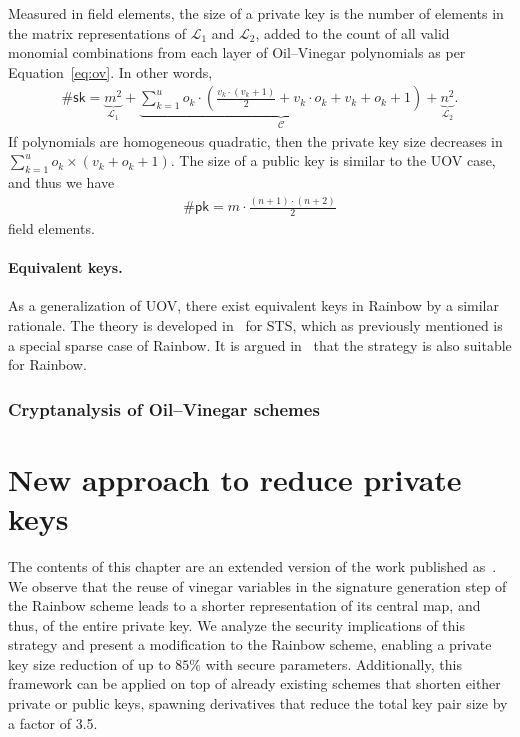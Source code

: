 \documentclass[draft, 12pt, a4paper, oneside]{memoir}
\theoremstyle{definition}
\begin{document}
Measured in field elements, the size of a private key is the number of elements in the matrix representations of $\mathcal{L}_{1}$ and $\mathcal{L}_{2}$, added to the count of all valid monomial combinations from each layer of Oil--Vinegar polynomials as per Equation~\ref{eq:ov}. In other words,
\begin{align}
  \#\mathsf{sk} = \underbrace{m^{2}}_{\mathcal{L}_{1}} 
    + \underbrace{\sum_{k = 1}^{u} o_{k} \cdot \left( \frac{v_{k} \cdot (v_{k} + 1)}{2} + v_{k} \cdot o_{k} + v_{k} + o_{k} + 1 \right)}_{\mathcal{C}}
    + \underbrace{n^{2}}_{\mathcal{L}_{2}}.
\end{align}
If polynomials are homogeneous quadratic, then the private key size decreases in $\sum_{k = 1}^{u} o_{k} \times (v_{k} + o_{k} + 1)$. The size of a public key is similar to the UOV case, and thus we have
\begin{align}
  \#\mathsf{pk} = m \cdot \frac{(n + 1) \cdot (n + 2)}{2}
\end{align}
field elements.

\subsubsection{Equivalent keys.}

As a generalization of UOV, there exist equivalent keys in Rainbow by a similar rationale. The theory is developed in~\cite[Section 4.4]{Wolf:201104} for STS, which as previously mentioned is a special sparse case of Rainbow. It is argued in~\cite{Petzoldt:201307} that the strategy is also suitable for Rainbow.

\subsection{Cryptanalysis of Oil--Vinegar schemes}\label{subsec:attacks}

\chapter{New approach to reduce private keys}\label{chapter:eta}

The contents of this chapter are an extended version of the work published as~\cite{Zambonin:201907}. We observe that the reuse of vinegar variables in the signature generation step of the Rainbow scheme leads to a shorter representation of its central map, and thus, of the entire private key. We analyze the security implications of this strategy and present a modification to the Rainbow scheme, enabling a private key size reduction of up to $85\%$ with secure parameters. Additionally, this framework can be applied on top of already existing schemes that shorten either private or public keys, spawning derivatives that reduce the total key pair size by a factor of 3.5.
\end{document}
